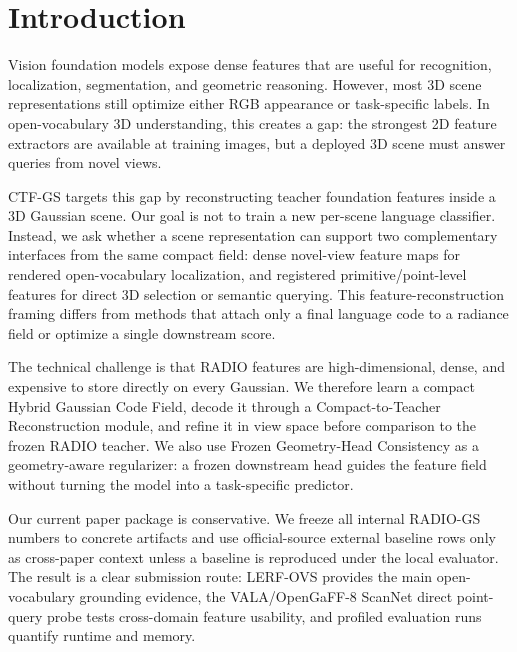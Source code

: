 \documentclass[10pt,twocolumn,letterpaper]{article}
\newcommand{\method}{CTF-GS}
\newcommand{\project}{RADIO-GS}
\begin{document}
\section{Introduction}

Vision foundation models expose dense features that are useful for recognition,
localization, segmentation, and geometric reasoning. However, most 3D scene
representations still optimize either RGB appearance or task-specific labels. In
open-vocabulary 3D understanding, this creates a gap: the strongest 2D feature
extractors are available at training images, but a deployed 3D scene must answer
queries from novel views.

\method{} targets this gap by reconstructing teacher foundation features inside a
3D Gaussian scene. Our goal is not to train a new per-scene language classifier.
Instead, we ask whether a scene representation can support two complementary
interfaces from the same compact field: dense novel-view feature maps for
rendered open-vocabulary localization, and registered primitive/point-level
features for direct 3D selection or semantic querying. This
feature-reconstruction framing differs from
methods that attach only a final language code to a radiance field or optimize a
single downstream score.

The technical challenge is that RADIO features are high-dimensional, dense, and
expensive to store directly on every Gaussian. We therefore learn a compact
Hybrid Gaussian Code Field, decode it through a Compact-to-Teacher
Reconstruction module, and refine it in view space before comparison to the
frozen RADIO teacher. We also use Frozen Geometry-Head Consistency as a
geometry-aware regularizer: a frozen downstream head guides the feature field
without turning the model into a task-specific predictor.

Our current paper package is conservative. We freeze all internal \project{}
numbers to concrete artifacts and use official-source external baseline rows only
as cross-paper context unless a baseline is reproduced under the local evaluator.
The result is a clear submission route: LERF-OVS provides the main
open-vocabulary grounding evidence, the VALA/OpenGaFF-8 ScanNet direct
point-query probe tests cross-domain feature usability, and profiled evaluation
runs quantify runtime and memory.
\end{document}

